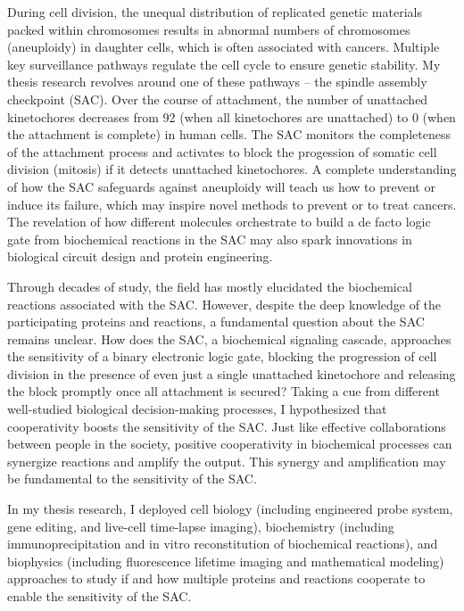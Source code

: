 During cell division, the unequal distribution of replicated genetic materials packed within chromosomes results in abnormal numbers of chromosomes (aneuploidy) in daughter cells, which is often associated with cancers. Multiple key surveillance pathways regulate the cell cycle to ensure genetic stability. My thesis research revolves around one of these pathways -- the spindle assembly checkpoint (SAC). Over the course of attachment, the number of unattached kinetochores decreases from 92 (when all kinetochores are unattached) to 0 (when the attachment is complete) in human cells. The SAC monitors the completeness of the attachment process and activates to block the progession of somatic cell division (mitosis) if it detects unattached kinetochores. A complete understanding of how the SAC safeguards against aneuploidy will teach us how to prevent or induce its failure, which may inspire novel methods to prevent or to treat cancers. The revelation of how different molecules orchestrate to build a de facto logic gate from biochemical reactions in the SAC may also spark innovations in biological circuit design and protein engineering.

Through decades of study, the field has mostly elucidated the biochemical reactions associated with the SAC. However, despite the deep knowledge of the participating proteins and reactions, a fundamental question about the SAC remains unclear. How does the SAC, a biochemical signaling cascade, approaches the sensitivity of a binary electronic logic gate, blocking the progression of cell division in the presence of even just a single unattached kinetochore and releasing the block promptly once all attachment is secured? Taking a cue from different well-studied biological decision-making processes, I hypothesized that cooperativity boosts the sensitivity of the SAC. Just like effective collaborations between people in the society, positive cooperativity in biochemical processes can synergize reactions and amplify the output. This synergy and amplification may be fundamental to the sensitivity of the SAC.

In my thesis research, I deployed cell biology (including engineered probe system, gene editing, and live-cell time-lapse imaging), biochemistry (including immunoprecipitation and in vitro reconstitution of biochemical reactions), and biophysics (including fluorescence lifetime imaging and mathematical modeling) approaches to study if and how multiple proteins and reactions cooperate to enable the sensitivity of the SAC.

